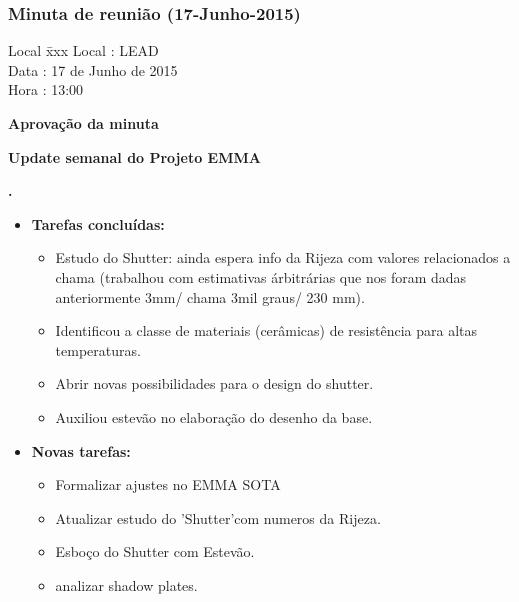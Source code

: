 \subsubsection{Minuta de reunião (17-Junho-2015)}

\begin{tabbing}
  Local \= xxx \kill
  Local \> : LEAD \\
  Data  \> : 17 de Junho de 2015 \\
  Hora  \> : 13:00
\end{tabbing}


\textbf{Aprovação da minuta}

\textbf{Update semanal do Projeto EMMA}
  
		
\textbf{\elael.} 
	\begin{itemize}
		\item \textbf{Tarefas concluídas:}
			\begin{itemize}    
				\item Estudo do Shutter: ainda espera info da Rijeza com valores
				relacionados a chama (trabalhou com estimativas árbitrárias que nos foram
				dadas anteriormente 3mm/ chama 3mil graus/ 230 mm).
				\item Identificou a classe de materiais (cerâmicas) de resistência para
				altas temperaturas.
				\item Abrir novas possibilidades para o design do shutter.
				\item Auxiliou estevão no elaboração do desenho da base.
			\end{itemize}
		
		\item \textbf{Novas tarefas:}
			\begin{itemize} 
				\item Formalizar ajustes no EMMA SOTA
				\item Atualizar estudo do 'Shutter'com numeros da Rijeza.
				\item Esboço do Shutter com Estevão.
				\item analizar shadow plates.
			\end{itemize}
	\end{itemize}
					

